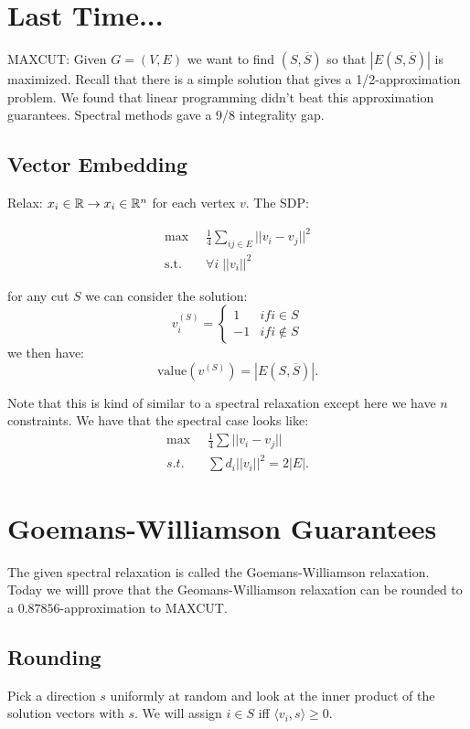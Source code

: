 \documentclass[11pt]{article}
\begin{document}

\section*{Last Time...}
MAXCUT: Given  $G=(V,E)$ we want to find $(S,\overline{S})$ so that $|E(S,\overline{S})|$ is maximized. Recall that there is a simple solution that gives a 1/2-approximation problem. We found that linear programming didn't beat this approximation guarantees. Spectral methods gave a 9/8 integrality gap.
\subsection*{Vector Embedding}
Relax: $x_i \in \mathbb{R} \to x_i \in \mathbb{R}^n$ for each vertex $v$. The SDP:

\begin{align*}
    \max \;& \;\frac{1}{4}\sum_{ij \in E} ||v_i - v_j||^2\\
    \text{s.t.}\;& \;\forall i\; ||v_i||^2
\end{align*}

for any cut $S$ we can consider the solution:
\[
    v_i^{(S)} = \begin{cases}1 &if i \in S\\
    -1 &if i \not\in S
    \end{cases}
\]
we then have:
\[
    \text{value}(v^{(S)}) = |E(S,\overline{S})|.
\]

Note that this is kind of similar to a spectral relaxation except here we have $n$ constraints. We have that the spectral case looks like:
\begin{align*}
    \max\; &\; \frac{1}{4}\sum ||v_i - v_j||\\
    s.t.\;&\;\sum d_i ||v_i||^2 = 2|E|.
\end{align*}


\section*{Goemans-Williamson Guarantees}
The given spectral relaxation is called the Goemans-Williamson relaxation. Today we willl prove that the Geomans-Williamson relaxation can be rounded to a $0.87856$-approximation to MAXCUT.

\subsection*{Rounding}
Pick a direction $s$ uniformly at random and look at the inner product of the solution vectors with $s$. We will assign $i\in S$ iff $\langle v_i , s\rangle \geq 0$.\\
\end{document}
